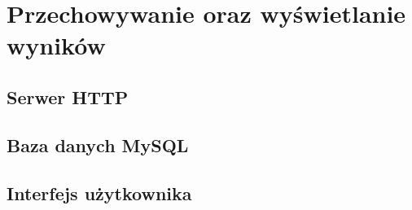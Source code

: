\chapter{Przechowywanie oraz wyświetlanie wyników}

\section{Serwer HTTP}

\section{Baza danych MySQL}

\section{Interfejs użytkownika}